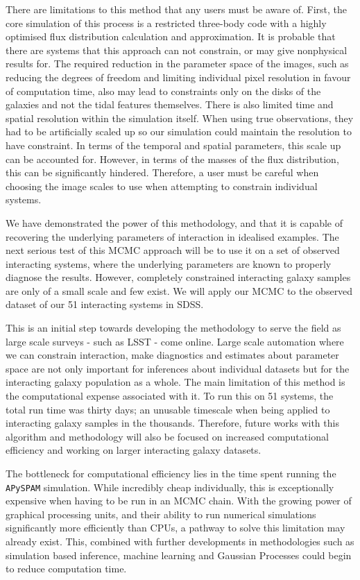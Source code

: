 There are limitations to this method that any users must be aware of. First, the core simulation of this process is a restricted three-body code with a highly optimised flux distribution calculation and approximation. It is probable that there are systems that this approach can not constrain, or may give nonphysical results for. The required reduction in the parameter space of the images, such as reducing the degrees of freedom and limiting individual pixel resolution in favour of computation time, also may lead to constraints only on the disks of the galaxies and not the tidal features themselves. There is also limited time and spatial resolution within the simulation itself. When using true observations, they had to be artificially scaled up so our simulation could maintain the resolution to have constraint. In terms of the temporal and spatial parameters, this scale up can be accounted for. However, in terms of the masses of the flux distribution, this can be significantly hindered. Therefore, a user must be careful when choosing the image scales to use when attempting to constrain individual systems. 

We have demonstrated the power of this methodology, and that it is capable of recovering the underlying parameters of interaction in idealised examples. The next serious test of this MCMC approach will be to use it on a set of observed interacting systems, where the underlying parameters are known to properly diagnose the results. However, completely constrained interacting galaxy samples are only of a small scale and few exist. We will apply our MCMC to the observed dataset of our 51 interacting systems in SDSS.

This is an initial step towards developing the methodology to serve the field as large scale surveys - such as LSST - come online. Large scale automation where we can constrain interaction, make diagnostics and estimates about parameter space are not only important for inferences about individual datasets but for the interacting galaxy population as a whole. The main limitation of this method is the computational expense associated with it. To run this on 51 systems, the total run time was thirty days; an unusable timescale when being applied to interacting galaxy samples in the thousands. Therefore, future works with this algorithm and methodology will also be focused on increased computational efficiency and working on larger interacting galaxy datasets. 

The bottleneck for computational efficiency lies in the time spent running the \texttt{APySPAM} simulation. While incredibly cheap individually, this is exceptionally expensive when having to be run in an MCMC chain. With the growing power of graphical processing units, and their ability to run numerical simulations significantly more efficiently than CPUs, a pathway to solve this limitation may already exist. This, combined with further developments in methodologies such as simulation based inference, machine learning and Gaussian Processes could begin to reduce computation time.
